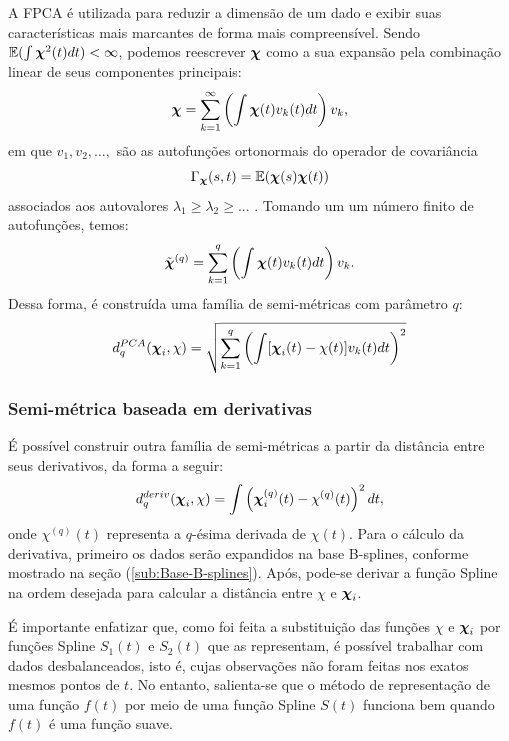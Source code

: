 \documentclass[
	12pt,				%
	openright,			%
	oneside,			%
	a4paper,			%
	english,			%
	brazil				%
	]{dissertacao-ufrgs-abntex2}
\begin{document}
A FPCA é utilizada para reduzir a dimensão de um dado e exibir suas
características mais marcantes de forma mais compreensível. Sendo
$\mathbb{E}(\int\boldsymbol{\chi}^{2}(t)dt)<\infty$, podemos reescrever $\boldsymbol{\chi}$
como a sua expansão pela combinação linear de seus componentes principais:
\begin{equation}
\boldsymbol{\chi}=\sum_{k=1}^{\text{\ensuremath{\infty}}}\left(\int\boldsymbol{\chi}(t)v_{k}(t)dt\right)v_{k},
\end{equation}
em que $v_{1},v_{2},...,$ são as autofunções ortonormais do operador de covariância
\begin{equation}
\Gamma_{\boldsymbol{\chi}}(s,t)=\mathbb{E}(\boldsymbol{\chi}(s)\boldsymbol{\chi}(t))
\end{equation}
associados aos autovalores $\lambda_{1}\geq\lambda_{2}\geq...$ .
Tomando um um número finito de autofunções, temos:
\begin{equation}
\tilde{\boldsymbol{\chi}}^{(q)}=\sum_{k=1}^{\text{\ensuremath{q}}}\left(\int\boldsymbol{\chi}(t)v_{k}(t)dt\right)v_{k}.
\end{equation}
Dessa forma, é construída uma família de semi-métricas com parâmetro
$q$:
\begin{equation}
d_{q}^{PCA}(\boldsymbol{\chi}_{i},\chi)=\sqrt{\sum_{k=1}^{\text{\ensuremath{q}}}\left(\int[\boldsymbol{\chi}_{i}(t)-\chi(t)]v_{k}(t)dt\right)^{2}}
\end{equation}



\subsubsection*{Semi-métrica baseada em derivativas}

É possível construir outra família de semi-métricas a partir da distância
entre seus derivativos, da forma a seguir:
\begin{equation}
d_{q}^{deriv}(\boldsymbol{\chi}_{i},\chi)=\int\left(\boldsymbol{\chi}_{i}^{(q)}(t)-\chi^{(q)}(t)\right)^{2}dt,
\end{equation}
onde $\chi^{(q)}(t)$ representa a $q$-ésima derivada de $\chi(t)$.
Para o cálculo da derivativa, primeiro os dados serão expandidos na
base B-splines, conforme mostrado na seção (\ref{sub:Base-B-splines}).
Após, pode-se derivar a função Spline na ordem desejada para calcular
a distância entre $\chi$ e $\boldsymbol{\chi}_{i}$.

É importante enfatizar que, como foi feita a substituição das funções
$\chi$ e $\boldsymbol{\chi}_{i}$ por funções Spline $S_{1}(t)$ e $S_{2}(t)$
que as representam, é possível trabalhar com dados desbalanceados,
isto é, cujas observações não foram feitas nos exatos mesmos pontos
de $t$. No entanto, salienta-se que o método de representação de
uma função $f(t)$ por meio de uma função Spline $S(t)$ funciona
bem quando $f(t)$ é uma função suave.
\end{document}

